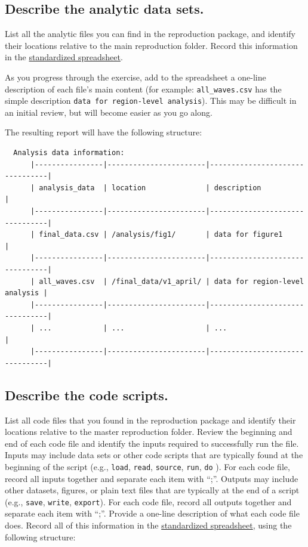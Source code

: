 \documentclass[]{book}
\begin{document}
\hypertarget{desc-analy}{%
\subsection{Describe the analytic data sets.}\label{desc-analy}}

List all the analytic files you can find in the reproduction package, and identify their locations relative to the main reproduction folder. Record this information in the \href{https://docs.google.com/spreadsheets/d/1LUIdVFH0OfR70C7z07TYeE-uWzKI_JIeWUMaYhqEKK0/edit\#gid=1299317837\&range=A1}{standardized spreadsheet}.

As you progress through the exercise, add to the spreadsheet a one-line description of each file's main content (for example: \texttt{all\_waves.csv} has the simple description \texttt{data\ for\ region-level\ analysis}). This may be difficult in an initial review, but will become easier as you go along.

The resulting report will have the following structure:

\begin{verbatim}
  Analysis data information:
      |----------------|-----------------------|--------------------------------|
      | analysis_data  | location              | description                    |
      |----------------|-----------------------|--------------------------------|
      | final_data.csv | /analysis/fig1/       | data for figure1               |
      |----------------|-----------------------|--------------------------------|
      | all_waves.csv  | /final_data/v1_april/ | data for region-level analysis |
      |----------------|-----------------------|--------------------------------|
      | ...            | ...                   | ...                            |
      |----------------|-----------------------|--------------------------------|
\end{verbatim}

\hypertarget{desc-scripts}{%
\subsection{Describe the code scripts.}\label{desc-scripts}}

List all code files that you found in the reproduction package and identify their locations relative to the master reproduction folder. Review the beginning and end of each code file and identify the inputs required to successfully run the file. Inputs may include data sets or other code scripts that are typically found at the beginning of the script (e.g., \texttt{load}, \texttt{read}, \texttt{source}, \texttt{run}, \texttt{do} ). For each code file, record all inputs together and separate each item with ``;''. Outputs may include other datasets, figures, or plain text files that are typically at the end of a script (e.g., \texttt{save}, \texttt{write}, \texttt{export}). For each code file, record all outputs together and separate each item with ``;''. Provide a one-line description of what each code file does. Record all of this information in the \href{https://docs.google.com/spreadsheets/d/1LUIdVFH0OfR70C7z07TYeE-uWzKI_JIeWUMaYhqEKK0/edit\#gid=1617799822\&range=A1}{standardized spreadsheet}, using the following structure:
\end{document}
